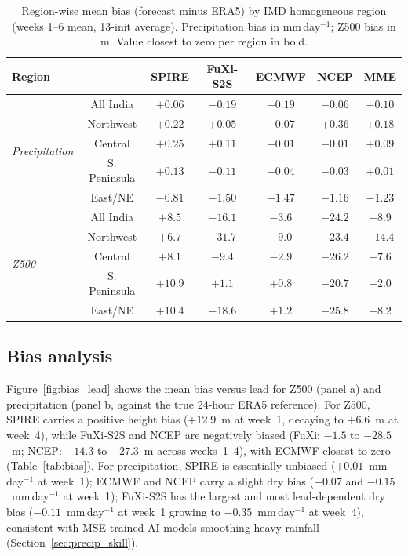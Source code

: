 \documentclass[11pt]{article}
\begin{document}
\begin{table}[t]\centering
\small
\setlength{\tabcolsep}{5pt}
\caption{Region-wise mean bias (forecast minus ERA5) by IMD homogeneous
region (weeks 1--6 mean, 13-init average). Precipitation bias in
mm\,day$^{-1}$; Z500 bias in m. Value closest to zero per region in
bold.}\label{tab:reg_bias}
\begin{tabular}{lcccccc}\toprule
Region & & SPIRE & FuXi-S2S & ECMWF & NCEP & MME \\
\midrule
\multirow{5}{*}{\emph{Precipitation}} &
All India    & $\mathbf{+0.06}$ & $-0.19$ & $-0.19$ & $-0.06$ & $-0.10$ \\
& Northwest    & $+0.22$ & $+0.05$ & $\mathbf{+0.07}$ & $+0.36$ & $+0.18$ \\
& Central      & $+0.25$ & $+0.11$ & $\mathbf{-0.01}$ & $\mathbf{-0.01}$ & $+0.09$ \\
& S. Peninsula & $+0.13$ & $-0.11$ & $\mathbf{+0.04}$ & $-0.03$ & $+0.01$ \\
& East/NE      & $\mathbf{-0.81}$ & $-1.50$ & $-1.47$ & $-1.16$ & $-1.23$ \\
\midrule
\multirow{5}{*}{\emph{Z500}} &
All India    & $+8.5$  & $-16.1$ & $\mathbf{-3.6}$  & $-24.2$ & $-8.9$ \\
& Northwest    & $+6.7$  & $-31.7$ & $\mathbf{-9.0}$  & $-23.4$ & $-14.4$ \\
& Central      & $+8.1$  & $-9.4$  & $\mathbf{-2.9}$  & $-26.2$ & $-7.6$ \\
& S. Peninsula & $+10.9$ & $+1.1$ & $\mathbf{+0.8}$  & $-20.7$ & $-2.0$ \\
& East/NE      & $+10.4$ & $-18.6$ & $\mathbf{+1.2}$  & $-25.8$ & $-8.2$ \\
\bottomrule
\end{tabular}\end{table}

\subsection{Bias analysis}\label{sec:bias}

Figure~\ref{fig:bias_lead} shows the mean bias versus lead for Z500
(panel a) and precipitation (panel b, against the true 24-hour ERA5
reference). For Z500, SPIRE carries a positive height bias
($+12.9$~m at week~1, decaying to $+6.6$~m at week~4), while FuXi-S2S
and NCEP are negatively biased (FuXi: $-1.5$ to $-28.5$~m; NCEP:
$-14.3$ to $-27.3$~m across weeks~1--4), with ECMWF closest to zero
(Table~\ref{tab:bias}). For precipitation, SPIRE is essentially unbiased
($+0.01$~mm\,day$^{-1}$ at week~1); ECMWF and NCEP carry a slight dry
bias ($-0.07$ and $-0.15$~mm\,day$^{-1}$ at week~1); FuXi-S2S has the
largest and most lead-dependent dry bias ($-0.11$~mm\,day$^{-1}$ at
week~1 growing to $-0.35$~mm\,day$^{-1}$ at week~4), consistent with
MSE-trained AI models smoothing heavy rainfall
(Section~\ref{sec:precip_skill}).
\end{document}
